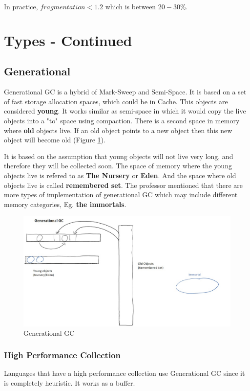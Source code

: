 \documentclass[twoside]{article}
\begin{document}
In practice, \(fragmentation < 1.2\)  which is between \(20-30\%\).

\section{Types - Continued}

\subsection{Generational}

Generational GC is a hybrid of Mark-Sweep and Semi-Space.  It is based on a set of fast storage allocation spaces, which could be in Cache. This objects are considered \textbf{young}. It works similar as semi-space in which it would copy the live objects into a "to" space using compaction. There is a second space in memory where \textbf{old} objects live. If an old object points to a new object then this new object will become old (Figure \ref{generationalGC}).

It is based on the assumption that young objects will not live very long, and  therefore they will be collected soon. The space of memory where the young objects live is refered to as \textbf{The Nursery} or \textbf{Eden}. And the space where old objects live is called \textbf{remembered set}. The professor mentioned that there are more types of implementation of generational GC which may include different memory categories, Eg. \textbf{the immortals}.

\begin{figure}[ht!]
\center
\includegraphics[width=150mm]{Generational.jpg}
\caption{ Generational GC \label{generationalGC}}
\end{figure}

\subsubsection*{High Performance Collection}
Languages that have a high performance collection use Generational GC since it is completely heuristic. It works as a buffer.
\end{document}
